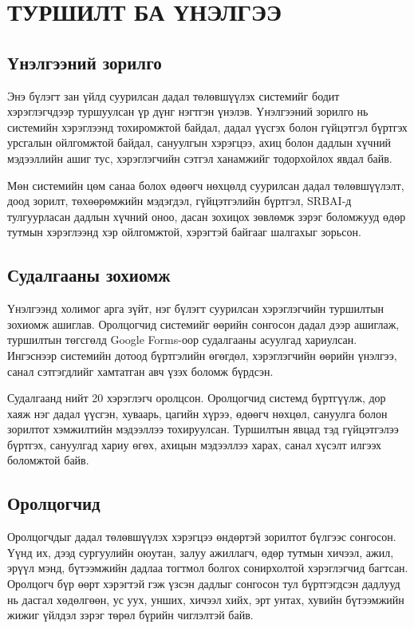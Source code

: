 ﻿\chapter{ТУРШИЛТ БА ҮНЭЛГЭЭ}

\section{Үнэлгээний зорилго}

Энэ бүлэгт зан үйлд суурилсан дадал төлөвшүүлэх системийг бодит хэрэглэгчдээр туршуулсан үр дүнг нэгтгэн үнэлэв. Үнэлгээний зорилго нь системийн хэрэглээнд тохиромжтой байдал, дадал үүсгэх болон гүйцэтгэл бүртгэх урсгалын ойлгомжтой байдал, сануулгын хэрэгцээ, ахиц болон дадлын хүчний мэдээллийн ашиг тус, хэрэглэгчийн сэтгэл ханамжийг тодорхойлох явдал байв.

Мөн системийн цөм санаа болох өдөөгч нөхцөлд суурилсан дадал төлөвшүүлэлт, доод зорилт, төхөөрөмжийн мэдэгдэл, гүйцэтгэлийн бүртгэл, SRBAI-д тулгуурласан дадлын хүчний оноо, дасан зохицох зөвлөмж зэрэг боломжууд өдөр тутмын хэрэглээнд хэр ойлгомжтой, хэрэгтэй байгааг шалгахыг зорьсон.

\section{Судалгааны зохиомж}

Үнэлгээнд холимог арга зүйт, нэг бүлэгт суурилсан хэрэглэгчийн туршилтын зохиомж ашиглав. Оролцогчид системийг өөрийн сонгосон дадал дээр ашиглаж, туршилтын төгсгөлд Google Forms-оор судалгааны асуулгад хариулсан. Ингэснээр системийн дотоод бүртгэлийн өгөгдөл, хэрэглэгчийн өөрийн үнэлгээ, санал сэтгэгдлийг хамтатган авч үзэх боломж бүрдсэн.

Судалгаанд нийт 20 хэрэглэгч оролцсон. Оролцогчид системд бүртгүүлж, дор хаяж нэг дадал үүсгэн, хуваарь, цагийн хүрээ, өдөөгч нөхцөл, сануулга болон зорилтот хэмжилтийн мэдээллээ тохируулсан. Туршилтын явцад тэд гүйцэтгэлээ бүртгэх, сануулгад хариу өгөх, ахицын мэдээллээ харах, санал хүсэлт илгээх боломжтой байв.

\section{Оролцогчид}

Оролцогчдыг дадал төлөвшүүлэх хэрэгцээ өндөртэй зорилтот бүлгээс сонгосон. Үүнд их, дээд сургуулийн оюутан, залуу ажиллагч, өдөр тутмын хичээл, ажил, эрүүл мэнд, бүтээмжийн дадлаа тогтмол болгох сонирхолтой хэрэглэгчид багтсан. Оролцогч бүр өөрт хэрэгтэй гэж үзсэн дадлыг сонгосон тул бүртгэгдсэн дадлууд нь дасгал хөдөлгөөн, ус уух, унших, хичээл хийх, эрт унтах, хувийн бүтээмжийн жижиг үйлдэл зэрэг төрөл бүрийн чиглэлтэй байв.

